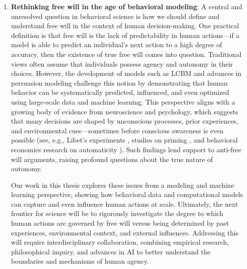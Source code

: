 \begin{enumerate}
         \item \textbf{Rethinking free will in the age of behavioral modeling}: A central and unresolved question in behavioral science is how we should define and understand free will in the context of human decision-making. One practical definition is that free will is the lack of predictability in human actions—if a model is able to predict an individual's next action to a high degree of accuracy, then the existence of true free will comes into question. Traditional views often assume that individuals possess agency and autonomy in their choices. However, the development of models such as LCBM \cite{khandelwal2023large} and advances in persuasion modeling \cite{singh2024measuring,khurana2023behavior} challenge this notion by demonstrating that human behavior can be systematically predicted, influenced, and even optimized using large-scale data and machine learning. This perspective aligns with a growing body of evidence from neuroscience and psychology, which suggests that many decisions are shaped by unconscious processes, prior experiences, and environmental cues—sometimes before conscious awareness is even possible (see, e.g., Libet's experiments \cite{libet1985unconscious,libet1993time}, studies on priming \cite{bargh1996automaticity}, and behavioral economics research on automaticity \cite{tversky1985framing,ariely2003coherent,johnson2003defaults}). Such findings lend support to anti-free will arguments, raising profound questions about the true nature of autonomy.


    Our work in this thesis explores these issues from a modeling and machine learning perspective, showing how behavioral data and computational models can capture and even influence human actions at scale. Ultimately, the next frontier for science will be to rigorously investigate the degree to which human actions are governed by free will versus being determined by past experiences, environmental context, and external influences. Addressing this will require interdisciplinary collaboration, combining empirical research, philosophical inquiry, and advances in AI to better understand the boundaries and mechanisms of human agency.



\end{enumerate}



